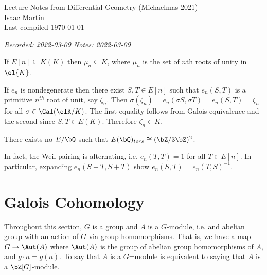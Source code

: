 

\newcommand{\lecture}[2]
{
	\newpage
	\addtocounter{lecture-counter}{1}
    \tchap{Lecture \arabic{lecture-counter}}
	\vspace{-1.5em}
    \begin{center}
	    \small \emph{Recorded: #1 \hspace{1.5em} Notes: #2}
    \end{center}
}


\pagestyle{empty}
	\LARGE
\begin{center}
	Lecture Notes from Differential Geometry (Michaelmas 2021) \\
	\Large
	Isaac Martin \\
    Last compiled \today
\end{center}
\normalsize
\vspace{-2mm}
\hru
\tableofcontents

\lecture{2022-03-09}{2022-03-09}

\begin{cor}\label{cor:roots-of-unity-and-n-torsion}
	If $E[n] \subseteq K(K)$ then $\mu_n \subseteq K$, where $\mu_n$ is the set of $n$th roots of unity in $\ol{K}$.
\end{cor}
\begin{prf}
	If $e_n$ is nondegenerate then there exist $S,T \in E[n]$ such that $e_n(S,T)$ is a primitive $n^{th}$ root of unit, say $\zeta_n$. Then $\sigma(\zeta_n) = e_n(\sigma S,\sigma T) = e_n(S,T) = \zeta_n$ for all $\sigma \in \Gal(\olK/K)$. The first equality follows from Galois equivalence and the second since $S,T \in E(K)$. Therefore $\zeta_n \in K$.
\end{prf}
\begin{example}
	There exists no $E/\bQ$ such that $E(\bQ)_{tors} \cong (\bZ/3\bZ)^2$.
\end{example}
\begin{rmk}
	In fact, the Weil pairing is alternating, i.e. $e_n(T, T) = 1$ for all $T \in E[n]$. In particular, expanding $e_n(S+T,S+T)$ show $e_n(S,T) = e_n(T,S)^{-1}$.
\end{rmk}
\section{Galois Cohomology}
Throughout this section, $G$ is a group and $A$ is a $G$-module, i.e. and abelian group with an action of $G$ via group homomorphisms. That is, we have a map $G \to \Aut(A)$ where $\Aut(A)$ is the group of abelian group homomorphisms of $A$, and $g\cdot a = g(a)$. To say that $A$ is a $G$=module is equivalent to saying that $A$ is a $\bZ[G]$-module.

